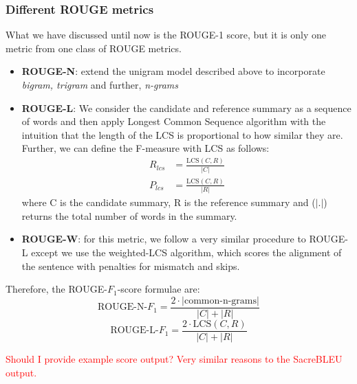 \documentclass[12pt,a4paper,twoside,openright]{report}
\newcommand{\red}[1]{\textcolor{red}{#1}}
\newcommand{\fone}{$F_1$}
\begin{document}
\subsubsection{Different ROUGE metrics}
What we have discussed until now is the ROUGE-1 score, but it is only one metric from one class of ROUGE metrics. 
\begin{itemize}
    \item \textbf{ROUGE-N}: extend the unigram model described above to incorporate \textit{bigram, trigram} and further, \textit{n-grams}
    \item \textbf{ROUGE-L}: We consider the candidate and reference summary as a sequence of words and then apply Longest Common Sequence algorithm with the intuition that the length of the LCS is proportional to how similar they are. Further, we can define the F-measure with LCS as follows: 
    \begin{align*}
        R_{lcs} &= \frac{\text{LCS}(C, R)}{|C|} \\
        P_{lcs} &= \frac{\text{LCS}(C, R)}{|R|}
    \end{align*}
    where C is the candidate summary, R is the reference summary and ($|.|$) returns the total number of words in the summary.
    
    \item \textbf{ROUGE-W}: for this metric, we follow a very similar procedure to ROUGE-L except we use the weighted-LCS algorithm, which scores the alignment of the sentence with penalties for mismatch and skips.
\end{itemize}
Therefore, the ROUGE-\fone-score formulae are: 
\begin{equation}
    \text{ROUGE-N-\fone} = \frac{2 \cdot | \text{common-n-grams} |}{|C| + |R|}
    \label{eq:rouge-n}
\end{equation}
\begin{equation}
    \text{ROUGE-L-\fone} = \frac{2 \cdot \text{LCS}(C, R)}{|C| + |R|}
    \label{eq:rouge-l}
\end{equation}

\red{Should I provide example score output? Very similar reasons to the SacreBLEU output.}
\end{document}

